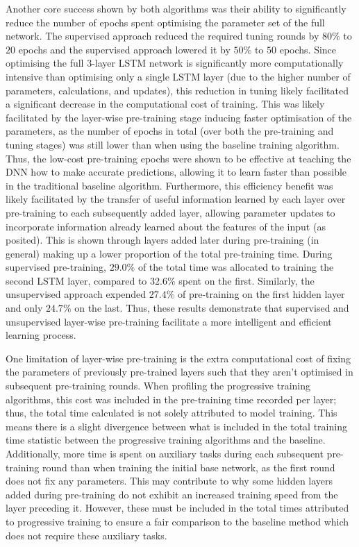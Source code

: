 \documentclass[a4paper, 11pt]{report}
\begin{document}
    Another core success shown by both algorithms was their ability to significantly reduce the number of epochs spent optimising the parameter set of the full network. The supervised approach reduced the required tuning rounds by $80\%$ to $20$ epochs and the supervised approach lowered it by $50\%$ to $50$ epochs. Since optimising the full 3-layer LSTM network is significantly more computationally intensive than optimising only a single LSTM layer (due to the higher number of parameters, calculations, and updates), this reduction in tuning likely facilitated a significant decrease in the computational cost of training. This was likely facilitated by the layer-wise pre-training stage inducing faster optimisation of the parameters, as the number of epochs in total (over both the pre-training and tuning stages) was still lower than when using the baseline training algorithm. Thus, the low-cost pre-training epochs were shown to be effective at teaching the DNN how to make accurate predictions, allowing it to learn faster than possible in the traditional baseline algorithm. Furthermore, this efficiency benefit was likely facilitated by the transfer of useful information learned by each layer over pre-training to each subsequently added layer, allowing parameter updates to incorporate information already learned about the features of the input (as \citet{xu-2021} posited). This is shown through layers added later during pre-training (in general) making up a lower proportion of the total pre-training time. During supervised pre-training, $29.0\%$ of the total time was allocated to training the second LSTM layer, compared to $32.6\%$ spent on the first. Similarly, the unsupervised approach expended $27.4\%$ of pre-training on the first hidden layer and only $24.7\%$ on the last. Thus, these results demonstrate that supervised and unsupervised layer-wise pre-training facilitate a more intelligent and efficient learning process. 

    One limitation of layer-wise pre-training is the extra computational cost of fixing the parameters of previously pre-trained layers such that they aren't optimised in subsequent pre-training rounds. When profiling the progressive training algorithms, this cost was included in the pre-training time recorded per layer; thus, the total time calculated is not solely attributed to model training. This means there is a slight divergence between what is included in the total training time statistic between the progressive training algorithms and the baseline. Additionally, more time is spent on auxiliary tasks during each subsequent pre-training round than when training the initial base network, as the first round does not fix any parameters. This may contribute to why some hidden layers added during pre-training do not exhibit an increased training speed from the layer preceding it. However, these must be included in the total times attributed to progressive training to ensure a fair comparison to the baseline method which does not require these auxiliary tasks.
\end{document}
